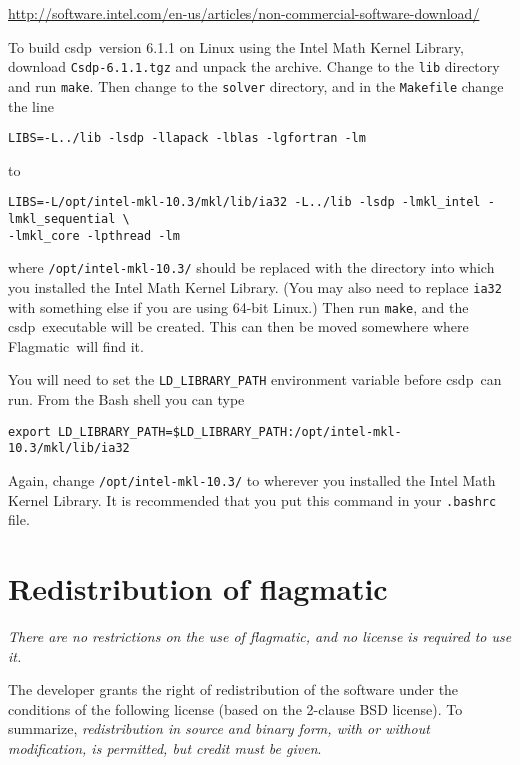 \documentclass{article}
\let\temptt\texttt
\renewcommand\texttt[1]{{\color{excolor} \temptt{#1}}}
\providecommand{\flagmatic}{Flagmatic}
\providecommand{\csdp}{csdp}
\begin{document}
\url{http://software.intel.com/en-us/articles/non-commercial-software-download/}

To build \csdp\ version 6.1.1 on Linux using the Intel Math Kernel Library, download \texttt{Csdp-6.1.1.tgz} and unpack the archive. Change to the \texttt{lib} directory and run \texttt{make}. Then change to the \texttt{solver} directory, and in the \texttt{Makefile} change the line

\begin{verbatim}
LIBS=-L../lib -lsdp -llapack -lblas -lgfortran -lm
\end{verbatim}

to

\begin{verbatim}
LIBS=-L/opt/intel-mkl-10.3/mkl/lib/ia32 -L../lib -lsdp -lmkl_intel -lmkl_sequential \
-lmkl_core -lpthread -lm
\end{verbatim}

where \texttt{/opt/intel-mkl-10.3/} should be replaced with the directory into which you installed the Intel Math Kernel Library. (You may also need to replace \texttt{ia32} with something else if you are using 64-bit Linux.) Then run \texttt{make}, and the \csdp\ executable will be created. This can then be moved somewhere where \flagmatic\  will find it.

You will need to set the \texttt{LD\_LIBRARY\_PATH} environment variable before \csdp\ can run. From the Bash shell you can type

\begin{verbatim}
export LD_LIBRARY_PATH=$LD_LIBRARY_PATH:/opt/intel-mkl-10.3/mkl/lib/ia32
\end{verbatim}

Again, change \texttt{/opt/intel-mkl-10.3/} to wherever you installed the Intel Math Kernel Library. It is recommended that you put this command in your \texttt{.bashrc} file.




\section{Redistribution of flagmatic} \label{license}

\emph{There are no restrictions on the use of flagmatic, and no license is required to use it.}

The developer grants the right of redistribution of the software under the conditions of the following license (based on the 2-clause BSD license). To summarize, \emph{redistribution in source and binary form, with or without modification, is permitted, but credit must be given}.
\end{document}

